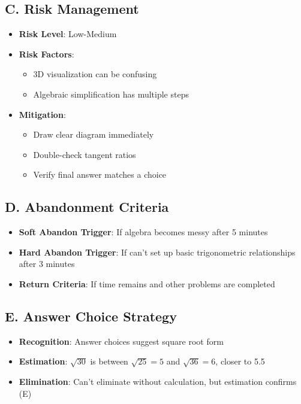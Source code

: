 \documentclass[12pt]{article}
\begin{document}
\begin{competitionbox}
\subsection*{C. Risk Management}
\begin{itemize}[leftmargin=*]
    \item \textbf{Risk Level}: Low-Medium
    \item \textbf{Risk Factors}:
    \begin{itemize}
        \item 3D visualization can be confusing
        \item Algebraic simplification has multiple steps
    \end{itemize}
    \item \textbf{Mitigation}:
    \begin{itemize}
        \item Draw clear diagram immediately
        \item Double-check tangent ratios
        \item Verify final answer matches a choice
    \end{itemize}
\end{itemize}

\subsection*{D. Abandonment Criteria}
\begin{itemize}[leftmargin=*]
    \item \textbf{Soft Abandon Trigger}: If algebra becomes messy after 5 minutes
    \item \textbf{Hard Abandon Trigger}: If can't set up basic trigonometric relationships after 3 minutes
    \item \textbf{Return Criteria}: If time remains and other problems are completed
\end{itemize}

\subsection*{E. Answer Choice Strategy}
\begin{itemize}[leftmargin=*]
    \item \textbf{Recognition}: Answer choices suggest square root form
    \item \textbf{Estimation}: $\sqrt{30}$ is between $\sqrt{25} = 5$ and $\sqrt{36} = 6$, closer to 5.5
    \item \textbf{Elimination}: Can't eliminate without calculation, but estimation confirms (E)
\end{itemize}
\end{competitionbox}
\end{document}
